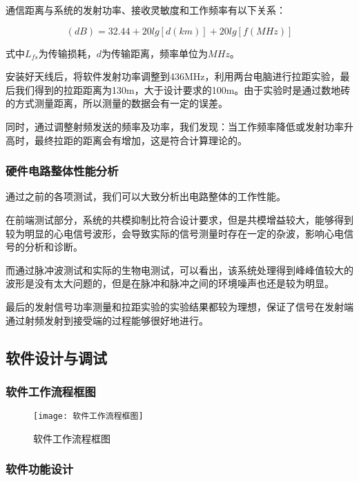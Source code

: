 \documentclass{zjureport}
\begin{document}
通信距离与系统的发射功率、接收灵敏度和工作频率有以下关系：

\begin{equation}
	[L_{fs}](dB)=32.44+20lg[d(km)]+20lg[f(MHz)]
\end{equation}

式中$L_{fs}$为传输损耗，$d$为传输距离，频率单位为$MHz$。

安装好天线后，将软件发射功率调整到436MHz，利用两台电脑进行拉距实验，最后我们得到的拉距距离为130m，大于设计要求的100m。由于实验时是通过数地砖的方式测量距离，所以测量的数据会有一定的误差。

同时，通过调整射频发送的频率及功率，我们发现：当工作频率降低或发射功率升高时，最终拉距的距离会有增加，这是符合计算理论的。

	
	\subsubsection{硬件电路整体性能分析}
	
	通过之前的各项测试，我们可以大致分析出电路整体的工作性能。
	
	在前端测试部分，系统的共模抑制比符合设计要求，但是共模增益较大，能够得到较为明显的心电信号波形，会导致实际的信号测量时存在一定的杂波，影响心电信号的分析和诊断。
	
	而通过脉冲波测试和实际的生物电测试，可以看出，该系统处理得到峰峰值较大的波形是没有太大问题的，但是在脉冲和脉冲之间的环境噪声也还是较为明显。
	
	最后的发射信号功率测量和拉距实验的实验结果都较为理想，保证了信号在发射端通过射频发射到接受端的过程能够很好地进行。
	
	\subsection{软件设计与调试}
	
	\subsubsection{软件工作流程框图}
	
	\begin{figure}[H]
		\centering%
		\texttt{[image: 软件工作流程框图]}
		\caption{软件工作流程框图}%
		\label{软件工作流程框图}%
	\end{figure}
	
	\subsubsection{软件功能设计}
	
\end{document}
